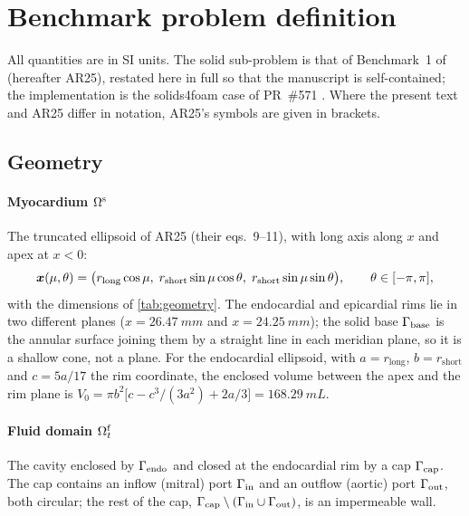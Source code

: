 \section{Benchmark problem definition}\label{sec:problem}

All quantities are in SI units. The solid sub-problem is that of Benchmark~1
of \citet{Arostica2025} (hereafter AR25), restated here in full so that the
manuscript is self-contained; the implementation is the solids4foam case of
PR~\#571 \citep{s4fPR571}. Where the present text and AR25 differ in
notation, AR25's symbols are given in brackets.

\subsection{Geometry}\label{sec:geometry}

\paragraph{Myocardium $\Omega^{\mathrm{s}}$} The truncated ellipsoid of AR25 (their eqs.~9--11),
with long axis along $x$ and apex at $x<0$:
\begin{equation}
\bm{x}(\mu,\theta) = \bigl(r_{\mathrm{long}}\cos\mu,\;
 r_{\mathrm{short}}\sin\mu\cos\theta,\;
 r_{\mathrm{short}}\sin\mu\sin\theta\bigr),\qquad \theta\in[-\pi,\pi],
\end{equation}
with the dimensions of \cref{tab:geometry}. The endocardial and epicardial
rims lie in two different planes ($x=\SI{26.47}{mm}$ and $x=\SI{24.25}{mm}$);
the solid base $\Gamma_{\mathrm{base}}$ is the annular surface joining them by a straight
line in each meridian plane, so it is a shallow cone, not a plane.
For the endocardial ellipsoid, with $a=r_{\mathrm{long}}$, $b=r_{\mathrm{short}}$
and $c = 5a/17$ the rim coordinate, the enclosed volume between the apex and
the rim plane is
$V_0 = \pi b^2\bigl[c - c^3/(3a^2) + 2a/3\bigr] = \SI{168.29}{mL}$.

\paragraph{Fluid domain $\Omega^{\mathrm{f}}_t$} The cavity enclosed by $\Gamma_{\mathrm{endo}}$ and closed at
the endocardial rim by a cap $\Gamma_{\mathrm{cap}}$. The cap contains an inflow (mitral)
port $\Gamma_{\mathrm{in}}$ and an outflow (aortic) port $\Gamma_{\mathrm{out}}$, both circular; the rest of
the cap, $\Gamma_{\mathrm{cap}}\setminus(\Gamma_{\mathrm{in}}\cup\Gamma_{\mathrm{out}})$, is an impermeable wall.

